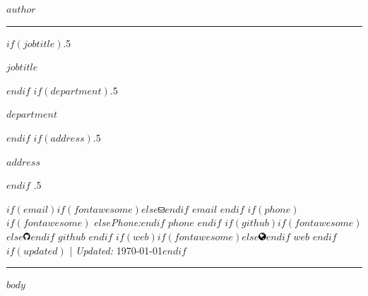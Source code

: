 \documentclass{article}
\begin{document}
\centerline{\huge \sffamily $author$}

\vspace{2 mm}

\hrule

\vspace{2 mm}

$if(jobtitle)$\moveleft.5\hoffset\centerline{$jobtitle$}$endif$
$if(department)$\moveleft.5\hoffset\centerline{$department$}$endif$
$if(address)$\moveleft.5\hoffset\centerline{$address$}$endif$
\moveleft.5\hoffset\centerline{ $if(email)$$if(fontawesome)$\faEnvelopeO \hspace{1 mm}$else$\includegraphics[height=6pt]{envelope}$endif$ \href{mailto:}{\tt $email$} \hspace{1 mm}$endif$ $if(phone)$$if(fontawesome)$ \faPhone \hspace{1 mm}$else$\emph{Phone:}$endif$  $phone$  \hspace{1 mm} $endif$ $if(github)$$if(fontawesome)$\faGithub \hspace{1 mm}$else$\includegraphics[height=8pt]{github}$endif$ \href{http://github.com/$github$}{\tt $github$} \hspace{1 mm} $endif$   $if(web)$$if(fontawesome)$\faGlobe \hspace{1 mm}$else$\includegraphics[height=8pt]{globe}$endif$ \href{http://$web$}{\tt $web$}  $endif$ $if(updated)$ | \emph{Updated:} \today$endif$}

\vspace{2 mm}

\hrule

$body$ 
\end{document}
